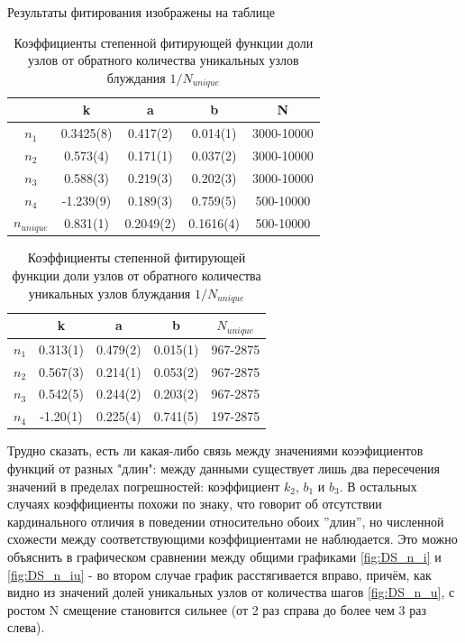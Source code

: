 Результаты фитирования изображены на таблице 

\begin{table}[h]
\centering
\begin{tabular}{|c|c|c|c|c|}
\hline
 & k & a & b & N \\ \hline
$n_1$ & 0.3425(8) & 0.417(2) & 0.014(1) & 3000-10000 \\ \hline
$n_2$ & 0.573(4) & 0.171(1) & 0.037(2) & 3000-10000 \\ \hline
$n_3$ & 0.588(3) & 0.219(3) & 0.202(3) & 3000-10000 \\ \hline
$n_4$ & -1.239(9) & 0.189(3) & 0.759(5) & 500-10000 \\ \hline
$n_{unique}$ & 0.831(1) & 0.2049(2) & 0.1616(4) & 500-10000 \\ \hline
\end{tabular}
\caption{Коэффициенты степенной фитирующей функции доли узлов от обратного количества шагов блуждания $1/N$}
\label{tab:n_i_log_log}

\begin{tabular}{|c|c|c|c|c|}
\hline
 & k & a & b & $N_{unique}$ \\ \hline
$n_1$ & 0.313(1) & 0.479(2) & 0.015(1) & 967-2875 \\ \hline
$n_2$ & 0.567(3) & 0.214(1) & 0.053(2) & 967-2875 \\ \hline
$n_3$  & 0.542(5) & 0.244(2) & 0.203(2) & 967-2875 \\ \hline
$n_4$ & -1.20(1) & 0.225(4) & 0.741(5) & 197-2875 \\ \hline
\end{tabular} 
\caption{Коэффициенты степенной фитирующей функции доли узлов от обратного количества уникальных узлов блуждания $1/N_{unique}$}
\label{tab:n_i_u_log_log}
\end{table}

Трудно сказать, есть ли какая-либо связь между значениями коээфициентов функций от разных "длин": 
между данными существует лишь два пересечения значений в пределах погрешностей: коэффициент $k_2$, $b_1$ и $b_3$. 
В остальных случаях коэффициенты похожи по знаку, что говорит об отсутствии кардинального отличия в поведении относительно обоих ''длин'', но численной схожести между соответствующими коэффициентами не наблюдается.
Это можно объяснить в графическом сравнении между общими графиками \ref{fig:DS_n_i} и \ref{fig:DS_n_iu} - во втором случае график расстягивается вправо, причём, как видно из значений долей уникальных узлов от количества шагов \ref{fig:DS_n_u}, с ростом N смещение становится сильнее (от 2 раз справа до более чем 3 раз слева).


\newpage 